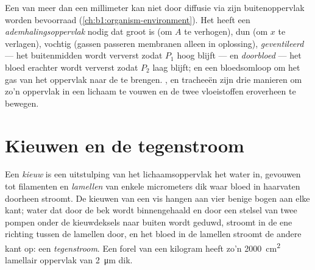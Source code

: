 \begin{proposition}\label{prop:b1:gas-exchange:requirements}
Een  van meer dan een millimeter kan niet door diffusie via zijn
buitenoppervlak worden bevoorraad (\cref{ch:b1:organism-environment}). Het heeft
een \emph{ademhalingsoppervlak} nodig dat groot is (om $A$ te verhogen), dun (om
$x$ te verlagen), vochtig (gassen passeren membranen alleen in oplossing),
\emph{geventileerd} --- het buitenmidden wordt ververst zodat $P_1$ hoog blijft ---
en \emph{doorbloed} --- het bloed erachter wordt ververst zodat $P_2$ laag blijft;
en een bloedsomloop om het gas van het oppervlak naar de  te brengen.
,  en tracheeën zijn drie manieren om zo'n oppervlak in een lichaam te
vouwen en de twee vloeistoffen eroverheen te bewegen.
\end{proposition}

\section{Kieuwen en de tegenstroom}

\begin{definition}[Kieuw]\label{def:b1:gas-exchange:gill}
Een \emph{kieuw} is een uitstulping van het lichaamsoppervlak het water in,
gevouwen tot filamenten en \emph{lamellen} van enkele micrometers dik waar bloed in
haarvaten doorheen stroomt. De kieuwen van een vis hangen aan vier benige bogen aan
elke kant; water dat door de bek wordt binnengehaald en door een stelsel van twee
pompen onder de kieuwdeksels naar buiten wordt geduwd, stroomt in de ene richting
tussen de lamellen door, en het bloed in de lamellen stroomt de andere kant op: een
\emph{tegenstroom}. Een forel van een kilogram heeft
zo'n \qty{2000}{cm^2} lamellair oppervlak van \qty{2}{\micro m} dik.
\end{definition}

